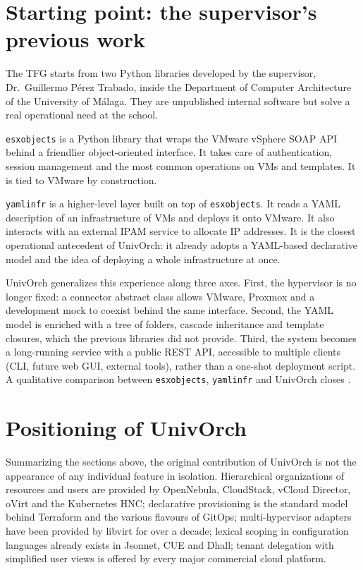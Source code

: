 \section{Starting point: the supervisor's previous work}
\label{sec:punto-partida}

The TFG starts from two Python libraries developed by the supervisor,
Dr.~Guillermo Pérez Trabado, inside the Department of Computer
Architecture of the University of Málaga. They are unpublished
internal software but solve a real operational need at the school.

\texttt{esxobjects} is a Python library that wraps the VMware
vSphere SOAP API behind a friendlier object-oriented interface. It
takes care of authentication, session management and the most
common operations on VMs and templates. It is tied to VMware by
construction.

\texttt{yamlinfr} is a higher-level layer built on top of
\texttt{esxobjects}. It reads a YAML description of an infrastructure
of VMs and deploys it onto VMware. It also interacts with an
external IPAM service to allocate IP addresses. It is the closest
operational antecedent of UnivOrch: it already adopts a YAML-based
declarative model and the idea of deploying a whole infrastructure
at once.

UnivOrch generalizes this experience along three axes. First, the
hypervisor is no longer fixed: a connector abstract class allows
VMware, Proxmox and a development mock to coexist behind the same
interface. Second, the YAML model is enriched with a tree of folders,
cascade inheritance and template closures, which the previous
libraries did not provide. Third, the system becomes a long-running
service with a public REST API, accessible to multiple clients
(CLI, future web GUI, external tools), rather than a one-shot
deployment script. A qualitative comparison between
\texttt{esxobjects}, \texttt{yamlinfr} and UnivOrch closes
.

\section{Positioning of UnivOrch}
\label{sec:positioning}

Summarizing the sections above, the original contribution of
UnivOrch is not the appearance of any individual feature in
isolation. Hierarchical organizations of resources and users are
provided by OpenNebula, CloudStack, vCloud Director, oVirt and the
Kubernetes HNC; declarative provisioning is the standard model
behind Terraform and the various flavours of GitOps; multi-hypervisor
adapters have been provided by libvirt for over a decade; lexical
scoping in configuration languages already exists in Jsonnet, CUE
and Dhall; tenant delegation with simplified user views is offered
by every major commercial cloud platform.

